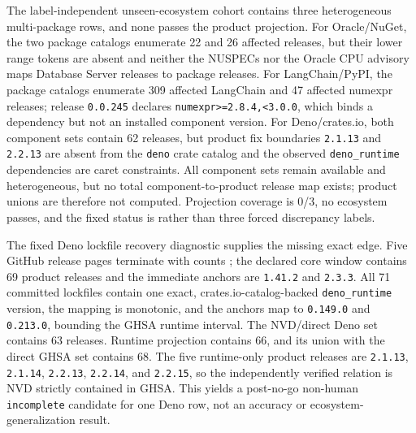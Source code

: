 The label-independent unseen-ecosystem cohort contains three heterogeneous multi-package rows, and none passes the product projection. For Oracle/NuGet, the two package catalogs enumerate 22 and 26 affected releases, but their lower range tokens are absent and neither the NUSPECs nor the Oracle CPU advisory maps Database Server  releases to package releases. For LangChain/PyPI, the package catalogs enumerate 309 affected LangChain and 47 affected numexpr releases; release \texttt{0.0.245} declares \texttt{numexpr\textgreater{}=2.8.4,\textless{}3.0.0}, which binds a dependency but not an installed component version. For Deno/crates.io, both component sets contain 62 releases, but product fix boundaries \texttt{2.1.13} and \texttt{2.2.13} are absent from the \texttt{deno} crate catalog and the observed \texttt{deno\_runtime} dependencies are caret constraints. All component sets remain available and heterogeneous, but no total component-to-product release map exists; product unions are therefore not computed. Projection coverage is 0/3, no ecosystem passes, and the fixed status is  rather than three forced discrepancy labels.

The fixed Deno lockfile recovery diagnostic supplies the missing exact edge. Five GitHub release pages terminate with counts ; the declared core window contains 69 product releases and the immediate anchors are \texttt{1.41.2} and \texttt{2.3.3}. All 71 committed lockfiles contain one exact, crates.io-catalog-backed \texttt{deno\_runtime} version, the mapping is monotonic, and the anchors map to \texttt{0.149.0} and \texttt{0.213.0}, bounding the GHSA runtime interval. The NVD/direct Deno set contains 63 releases. Runtime projection contains 66, and its union with the direct GHSA set contains 68. The five runtime-only product releases are \texttt{2.1.13}, \texttt{2.1.14}, \texttt{2.2.13}, \texttt{2.2.14}, and \texttt{2.2.15}, so the independently verified relation is NVD strictly contained in GHSA. This yields a post-no-go non-human \texttt{incomplete} candidate for one Deno row, not an accuracy or ecosystem-generalization result.

